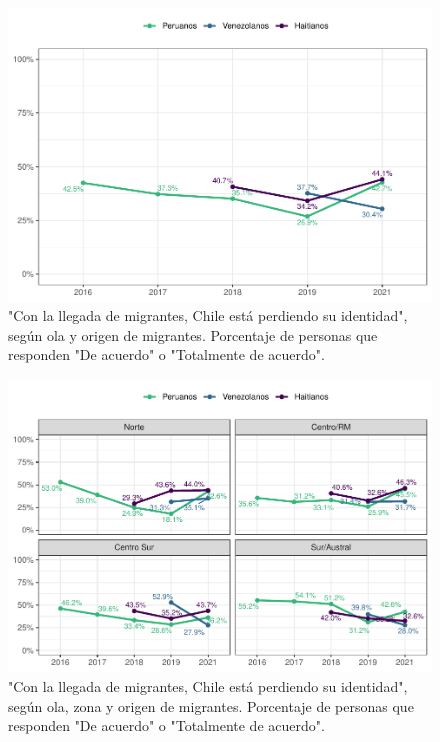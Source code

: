 \documentclass[
  12pt,
  openany]{book}
\begin{document}
\begin{figure}

{\centering \includegraphics{reporte-elsoc_files/figure-latex/amen2-wave-1} 

}

\caption{"Con la llegada de migrantes, Chile está perdiendo su identidad", según ola y origen de migrantes. Porcentaje de personas que responden "De acuerdo" o "Totalmente de acuerdo".}\label{fig:amen2-wave}
\end{figure}

\begin{figure}

{\centering \includegraphics{reporte-elsoc_files/figure-latex/amen2-zona-1} 

}

\caption{"Con la llegada de migrantes, Chile está perdiendo su identidad", según ola, zona y origen de migrantes. Porcentaje de personas que responden "De acuerdo" o "Totalmente de acuerdo".}\label{fig:amen2-zona}
\end{figure}
\end{document}
